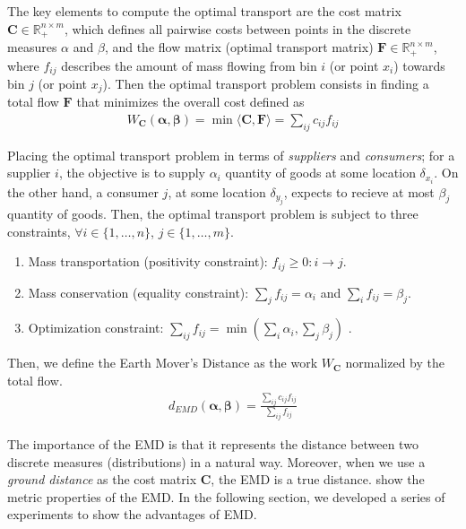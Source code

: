The key elements to compute the optimal transport are the cost matrix $\mathbf{C} \in \mathbb{R}^{n\times m}_+$, which defines all pairwise costs between points in the discrete measures $\alpha$ and $\beta$, and the flow matrix (optimal transport matrix) $\mathbf{F} \in \mathbb{R}^{n\times m}_+$, where $f_{ij}$ describes the amount of mass flowing from bin $i$ (or point $x_i$) towards bin $j$ (or point $x_j$). Then the optimal transport problem consists in finding a total flow $\mathbf{F}$ that minimizes the overall cost defined as
\begin{eqnarray}
W_{\mathbf{C}}(\boldsymbol{\alpha}, \boldsymbol{\beta}) = \min \langle\mathbf{C},\mathbf{F}\rangle = \sum\nolimits_{ij} c_{ij}f_{ij}
\label{eq:optimal_work}
\end{eqnarray}

Placing the optimal transport problem in terms of \textit{suppliers} and \textit{consumers}; for a supplier $i$, the objective is to supply $\alpha_i$ quantity of goods at some location $\delta_{x_i}$. On the other hand, a consumer $j$, at some location $\delta_{y_j}$, expects to recieve at most $\beta_j$ quantity of goods. Then, the optimal transport problem is subject to three constraints, $\forall i \in\{1, \ldots, n\}$, $j \in\{1, \ldots, m\}$.

\begin{enumerate}%
 \item Mass transportation (positivity constraint): $f_{ij} \geq 0 : i\rightarrow j$.
 \item Mass conservation (equality constraint):  $\sum_{j}f_{ij}=\alpha_i$ and $\sum_{i}f_{ij}= \beta_j$.
 \item Optimization constraint: $\sum_{ij}f_{ij} = \min \left( \sum_{i}\alpha_i, \sum_{j}\beta_j \right)$ .
\end{enumerate}  

Then, we define the Earth Mover's Distance as the work $W_{\mathbf{C}}$ normalized by the total flow.
\begin{eqnarray}
d_{EMD}(\boldsymbol{\alpha}, \boldsymbol{\beta}) = \frac{\sum_{ij}c_{ij}f_{ij}}{\sum_{ij}f_{ij}}
\label{eq:emd}
\end{eqnarray}

The importance of the EMD is that it represents the distance between two discrete measures (distributions) in a natural way. Moreover, when we use a \textit{ground distance} as the cost matrix $\mathbf{C}$, the EMD is a true distance. \cite{Peyre.Cuturi:arXiv:2018} show the metric properties of the EMD. In the following section, we developed a series of experiments to show the advantages of EMD. 

